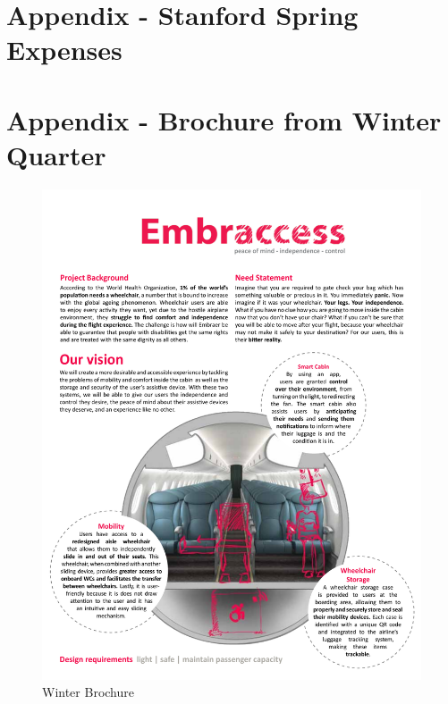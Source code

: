 \chapter{Appendix - Stanford Spring Expenses}
\label{appendix:expenses}


\newpage

\chapter{Appendix - Brochure from Winter Quarter}

\begin{figure}[h!]
	\centering
		\includegraphics[width=1\textwidth, page=1]{Figures/Winter_Brochure.pdf}
		\caption{Winter Brochure}
		\label{fig:wbrochure}
\end{figure}
